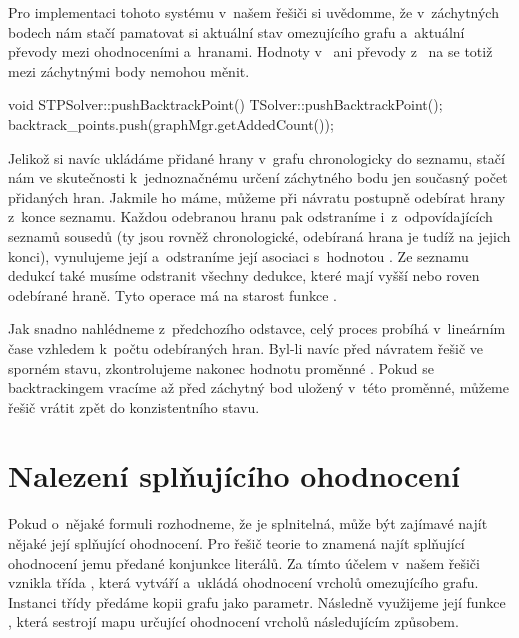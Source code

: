 Pro implementaci tohoto systému v~našem řešiči si uvědomme, že v~záchytných bodech nám stačí pamatovat si aktuální stav omezujícího grafu a~aktuální převody mezi ohodnoceními a~hranami. Hodnoty v~ ani převody z~ na  se totiž mezi záchytnými body nemohou měnit.

\begin{code}
void STPSolver::pushBacktrackPoint() {
	TSolver::pushBacktrackPoint();
	backtrack_points.push(graphMgr.getAddedCount());
}
\end{code}

Jelikož si navíc ukládáme přidané hrany v~grafu chronologicky do seznamu, stačí nám ve skutečnosti k~jednoznačnému určení záchytného bodu jen současný počet přidaných hran. Jakmile ho máme, můžeme při návratu postupně odebírat hrany z~konce seznamu. Každou odebranou hranu pak odstraníme i~z~odpovídajících seznamů sousedů (ty jsou rovněž chronologické, odebíraná hrana je tudíž na jejich konci), vynulujeme její  a~odstraníme její asociaci s~hodnotou . Ze seznamu dedukcí také musíme odstranit všechny dedukce, které mají  vyšší nebo roven odebírané hraně.  Tyto operace má na starost funkce . 

Jak snadno nahlédneme z~předchozího odstavce, celý proces probíhá v~lineárním čase vzhledem k~počtu odebíraných hran. Byl-li navíc před návratem řešič ve sporném stavu, zkontrolujeme nakonec hodnotu proměnné . Pokud se backtrackingem vracíme až před záchytný bod uložený v~této proměnné, můžeme řešič vrátit zpět do konzistentního stavu.

\section{Nalezení splňujícího ohodnocení}

Pokud o~nějaké formuli rozhodneme, že je splnitelná, může být zajímavé najít nějaké její splňující ohodnocení. Pro řešič teorie to znamená najít splňující ohodnocení jemu předané konjunkce literálů. Za tímto účelem v~našem řešiči vznikla třída , která vytváří a~ukládá ohodnocení vrcholů omezujícího grafu. Instanci třídy předáme kopii grafu jako parametr. Následně využijeme její funkce , která sestrojí mapu určující ohodnocení vrcholů následujícím způsobem.

